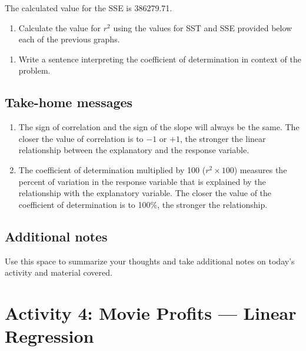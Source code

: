 \documentclass[
]{report}
\providecommand{\tightlist}{%
  \setlength{\itemsep}{0pt}\setlength{\parskip}{0pt}}
\begin{document}
The calculated value for the SSE is 386279.71.

\begin{enumerate}
\def\labelenumi{\arabic{enumi}.}
\setcounter{enumi}{5}
\tightlist
\item
  Calculate the value for \(r^2\) using the values for SST and SSE provided below each of the previous graphs.
\end{enumerate}

\vspace{1in}

\begin{enumerate}
\def\labelenumi{\arabic{enumi}.}
\setcounter{enumi}{6}
\tightlist
\item
  Write a sentence interpreting the coefficient of determination in context of the problem.
\end{enumerate}

\newpage

\hypertarget{take-home-messages-6}{%
\subsection{Take-home messages}\label{take-home-messages-6}}

\begin{enumerate}
\def\labelenumi{\arabic{enumi}.}
\item
  The sign of correlation and the sign of the slope will always be the same. The closer the value of correlation is to \(-1\) or \(+1\), the stronger the linear relationship between the explanatory and the response variable.
\item
  The coefficient of determination multiplied by 100 (\(r^2 \times 100\)) measures the percent of variation in the response variable that is explained by the relationship with the explanatory variable. The closer the value of the coefficient of determination is to 100\%, the stronger the relationship.
\end{enumerate}

\hypertarget{additional-notes-6}{%
\subsection{Additional notes}\label{additional-notes-6}}

Use this space to summarize your thoughts and take additional notes on today's activity and material covered.

\newpage

\hypertarget{activity-4-movie-profits-linear-regression}{%
\section{Activity 4: Movie Profits --- Linear Regression}\label{activity-4-movie-profits-linear-regression}}
\end{document}
